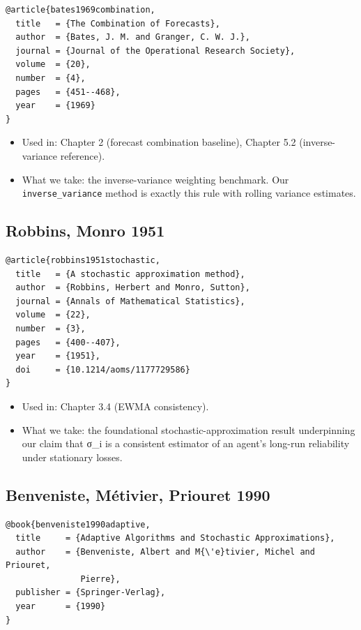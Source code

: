 \documentclass[11pt,a4paper,openany]{report}
\begin{document}
\begin{verbatim}
@article{bates1969combination,
  title   = {The Combination of Forecasts},
  author  = {Bates, J. M. and Granger, C. W. J.},
  journal = {Journal of the Operational Research Society},
  volume  = {20},
  number  = {4},
  pages   = {451--468},
  year    = {1969}
}
\end{verbatim}

\begin{itemize}
  \item Used in: Chapter 2 (forecast combination baseline),
    Chapter 5.2 (inverse-variance reference).
  \item What we take: the inverse-variance weighting benchmark. Our
    \texttt{inverse\_variance} method is exactly this rule with rolling variance
    estimates.
\end{itemize}

\subsection{Robbins, Monro 1951}

\begin{verbatim}
@article{robbins1951stochastic,
  title   = {A stochastic approximation method},
  author  = {Robbins, Herbert and Monro, Sutton},
  journal = {Annals of Mathematical Statistics},
  volume  = {22},
  number  = {3},
  pages   = {400--407},
  year    = {1951},
  doi     = {10.1214/aoms/1177729586}
}
\end{verbatim}

\begin{itemize}
  \item Used in: Chapter 3.4 (EWMA consistency).
  \item What we take: the foundational stochastic-approximation result
    underpinning our claim that σ\_i is a consistent estimator of an
    agent's long-run reliability under stationary losses.
\end{itemize}

\subsection{Benveniste, Métivier, Priouret 1990}

\begin{verbatim}
@book{benveniste1990adaptive,
  title     = {Adaptive Algorithms and Stochastic Approximations},
  author    = {Benveniste, Albert and M{\'e}tivier, Michel and Priouret,
               Pierre},
  publisher = {Springer-Verlag},
  year      = {1990}
}
\end{verbatim}
\end{document}
